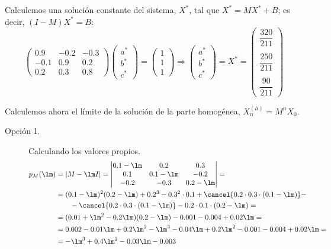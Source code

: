 \begin{ejercicio}
Calculemos una solución constante del sistema, $X^\ast$, tal que $X^\ast = MX^\ast + B$;
es decir, $(I-M)X^\ast = B$:
\begin{equation*}
    \begin{pmatrix}
        0.9 & -0.2 & -0.3\\
        -0.1 & 0.9 & 0.2\\
        0.2 & 0.3 & 0.8
    \end{pmatrix}\begin{pmatrix}
        a^\ast\\
        b^\ast\\
        c^\ast
    \end{pmatrix} = \begin{pmatrix}
        1\\
        1\\
        1
    \end{pmatrix}
    \Longrightarrow
    \begin{pmatrix}
        a^\ast\\
        b^\ast\\
        c^\ast
    \end{pmatrix} = X^\ast =  \begin{pmatrix}
        \dfrac{320}{211} \\ \\
        \dfrac{250}{211} \\ \\
        \dfrac{90}{211}
    \end{pmatrix}
\end{equation*}

Calculemos ahora el límite de la solución de la parte homogénea, $X_n^{(h)} = M^nX_0$.
\begin{description}
    \item[Opción 1.] Calculando los valores propios.
    \begin{align*}
        p_M(\lm) &= |M - \lm I| = \begin{vmatrix}
            0.1-\lm & 0.2 & 0.3\\
            0.1 & 0.1-\lm & -0.2\\
            -0.2 & -0.3 & 0.2-\lm
        \end{vmatrix} =\\
        &= (0.1-\lm)^2(0.2-\lm) + 0.2^3-0.3^2\cdot 0.1 +\cancel{0.2\cdot 0.3\cdot (0.1-\lm)}-\\&\qquad -\cancel{0.2\cdot 0.3\cdot (0.1-\lm)}-0.2\cdot 0.1\cdot (0.2-\lm) =\\
        &= (0.01+\lm^2-0.2\lm)(0.2-\lm) -0.001 -0.004 +0.02\lm =\\
        &= 0.002 -0.01\lm +0.2\lm^2 -\lm^3-0.04\lm+0.2\lm^2-0.001 -0.004 +0.02\lm=\\
        &= -\lm^3+0.4\lm^2-0.03\lm -0.003
    \end{align*}


\end{description}
\end{ejercicio}
